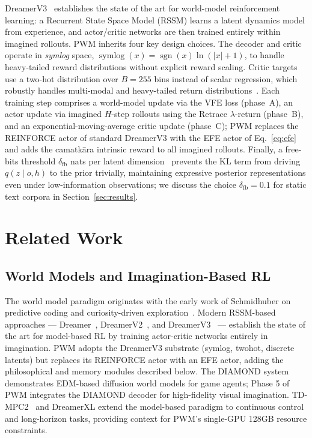 \documentclass[journal,onecolumn,11pt]{IEEEtran}
\begin{document}
DreamerV3~\cite{hafner2023dreamerv3} establishes the state of the art for
world-model reinforcement learning: a Recurrent State Space Model (RSSM)
learns a latent dynamics model from experience, and actor/critic networks are
then trained entirely within imagined rollouts.
PWM inherits four key design choices.
The decoder and critic operate in \emph{symlog} space,
$\operatorname{symlog}(x) = \operatorname{sgn}(x) \ln(|x|+1)$, to handle
heavy-tailed reward distributions without explicit reward scaling.
Critic targets use a two-hot distribution over $B=255$ bins instead of scalar
regression, which robustly handles multi-modal and heavy-tailed return
distributions~\cite{hafner2023dreamerv3}.
Each training step comprises a world-model update via the VFE loss
(phase~A), an actor update via imagined $H$-step rollouts using the Retrace
$\lambda$-return (phase~B), and an exponential-moving-average critic update
(phase~C); PWM replaces the REINFORCE actor of standard DreamerV3 with the
EFE actor of Eq.~\eqref{eq:efe} and adds the camatkāra intrinsic reward to
all imagined rollouts.
Finally, a free-bits threshold $\delta_{\text{fb}}$ nats per latent
dimension~\cite{kingma2014vae} prevents the KL term from driving
$q(z\mid o,h)$ to the prior trivially, maintaining expressive posterior
representations even under low-information observations; we discuss the
choice $\delta_{\text{fb}} = 0.1$ for static text corpora in
Section~\ref{sec:results}.

\section{Related Work}\label{sec:related}

\subsection{World Models and Imagination-Based RL}

The world model paradigm originates with the early work of Schmidhuber on
predictive coding and curiosity-driven
exploration~\cite{schmidhuber1991possibility,schmidhuber2010formal}.
Modern RSSM-based approaches — Dreamer~\cite{hafner2019dream},
DreamerV2~\cite{hafner2020mastering}, and DreamerV3~\cite{hafner2023dreamerv3} —
establish the state of the art for model-based RL by training actor-critic
networks entirely in imagination.
PWM adopts the DreamerV3 substrate (symlog, twohot, discrete latents) but
replaces its REINFORCE actor with an EFE actor, adding the philosophical and
memory modules described below.
The DIAMOND system~\cite{alonso2024diamond} demonstrates EDM-based diffusion
world models for game agents; Phase 5 of PWM integrates the DIAMOND decoder
for high-fidelity visual imagination.
TD-MPC2~\cite{hansen2024tdmpc2} and DreamerXL extend the model-based paradigm
to continuous control and long-horizon tasks, providing context for PWM's
single-GPU 128GB resource constraints.
\end{document}

